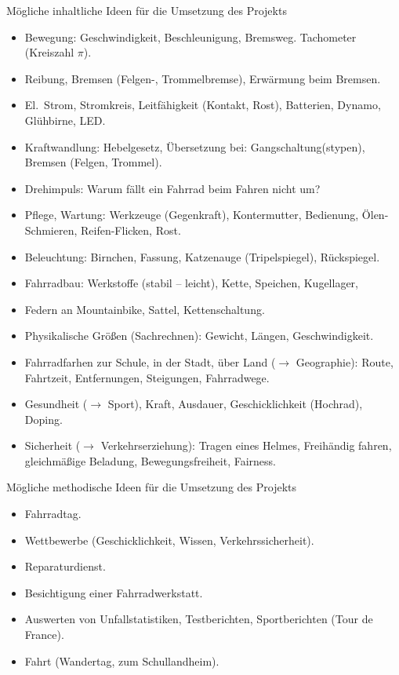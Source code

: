 \begin{beisp}
	M\"{o}gliche inhaltliche Ideen f\"{u}r die Umsetzung des Projekts \textbf{}
	\begin{itemize} %
	\item
	Bewegung: Geschwindigkeit, Beschleunigung, Bremsweg.
	Tachometer (Kreiszahl $\pi$).
	\item
	Reibung, Bremsen (Felgen-, Trommelbremse),
	Erw\"{a}rmung beim Bremsen.
	\item
	El.\ Strom, Stromkreis, Leitf\"{a}higkeit (Kontakt, Rost), Batterien,
	Dynamo, Gl\"{u}hbirne, LED.
	\item
	Kraftwandlung: Hebelgesetz, \"{U}bersetzung bei: Gangschaltung(stypen),
	Bremsen (Felgen, Trommel).
	\item
	Drehimpuls: Warum f\"{a}llt ein Fahrrad beim Fahren nicht um?
	\item
	Pflege, Wartung: Werkzeuge (Gegenkraft), Kontermutter,
	Bedienung, \"{O}len-Schmieren, Reifen-Flicken, Rost.
	\item
	Beleuchtung: Birnchen, Fassung, Katzenauge
	(Tripelspiegel), R\"{u}ckspiegel.
	\item
	Fahrradbau: Werkstoffe (stabil -- leicht),
	Kette, Speichen, Kugellager,
	\item
	Federn an Mountainbike, Sattel, Kettenschaltung.
	\item
	Physikalische Gr\"{o}{\ss}en (Sachrechnen): Gewicht, L\"{a}ngen,
	Geschwindigkeit.
	\item
	Fahrradfarhen zur Schule, in der Stadt, \"{u}ber Land
	($\to$ Geographie):
	Route, Fahrtzeit, Entfernungen, Steigungen, Fahrradwege.
	\item
	Gesundheit ($\to$ Sport), Kraft, Ausdauer, Geschicklichkeit
	(Hochrad), Doping.
	\item
	Sicherheit ($\to$ Verkehrserziehung): Tragen eines Helmes,
	Freih\"{a}ndig fahren,
	gleichm\"{a}{\ss}ige Beladung, Bewegungsfreiheit, Fairness.
	\end{itemize}
	
	M\"{o}gliche methodische Ideen f\"{u}r die Umsetzung des Projekts
	\begin{itemize}
	\item
	Fahrradtag.
	\item
	Wettbewerbe (Geschicklichkeit, Wissen, Verkehrssicherheit).
	\item
	Reparaturdienst.
	\item
	Besichtigung einer Fahrradwerkstatt.
	\item
	Auswerten von Unfallstatistiken, Testberichten, Sportberichten
	(Tour de France).
	\item
	Fahrt (Wandertag, zum Schullandheim).
	\end{itemize}

\end{beisp}



